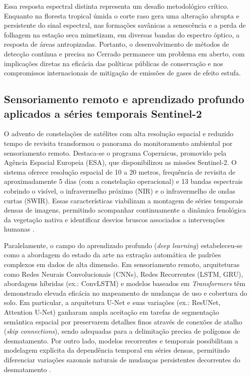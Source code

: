\documentclass[12pt,a4paper]{article}
\begin{document}
Essa resposta espectral distinta representa um desafio metodológico crítico. Enquanto na floresta tropical úmida o corte raso gera uma alteração abrupta e persistente do sinal espectral, nas formações savânicas a senescência e a perda de folhagem na estação seca mimetizam, em diversas bandas do espectro óptico, a resposta de áreas antropizadas. Portanto, o desenvolvimento de métodos de detecção contínua e precisa no Cerrado permanece um problema em aberto, com implicações diretas na eficácia das políticas públicas de conservação e nos compromissos internacionais de mitigação de emissões de gases de efeito estufa.

\subsection{Sensoriamento remoto e aprendizado profundo aplicados a séries temporais Sentinel-2}
\label{subsec:sr-dl}

O advento de constelações de satélites com alta resolução espacial e reduzido tempo de revisita transformou o panorama do monitoramento ambiental por sensoriamento remoto. Destaca-se o programa Copernicus, promovido pela Agência Espacial Europeia (ESA), que disponibilizou as missões Sentinel-2. O sistema oferece resolução espacial de 10 a 20 metros, frequência de revisita de aproximadamente 5 dias (com a constelação operacional) e 13 bandas espectrais cobrindo o visível, o infravermelho próximo (NIR) e o infravermelho de ondas curtas (SWIR). Essas características viabilizam a montagem de séries temporais densas de imagens, permitindo acompanhar continuamente a dinâmica fenológica da vegetação nativa e identificar desvios bruscos associados a intervenções humanas \citep{drusch2012sentinel}.

Paralelamente, o campo do aprendizado profundo (\textit{deep learning}) estabeleceu-se como a abordagem do estado da arte na extração automática de padrões complexos em dados de alta dimensão. Em sensoriamento remoto, arquiteturas como Redes Neurais Convolucionais (CNNs), Redes Recorrentes (LSTM, GRU), abordagens híbridas (ex.: ConvLSTM) e modelos baseados em \textit{Transformers} têm demonstrado elevada eficácia no mapeamento de mudanças de uso e cobertura do solo. Em particular, a arquitetura U-Net \citep{ronneberger2015unet} e suas variações (ex.: ResUNet, Attention U-Net) ganharam ampla aceitação em tarefas de segmentação semântica espacial por preservarem detalhes finos através de conexões de atalho (\textit{skip connections}), sendo adequadas para a delimitação precisa de polígonos de desmatamento. Por outro lado, modelos recorrentes e temporais possibilitam a modelagem explícita da dependência temporal em séries densas, permitindo diferenciar variações sazonais naturais de mudanças persistentes decorrentes do desmatamento \citep{rußwurm2018multi}.
\end{document}
